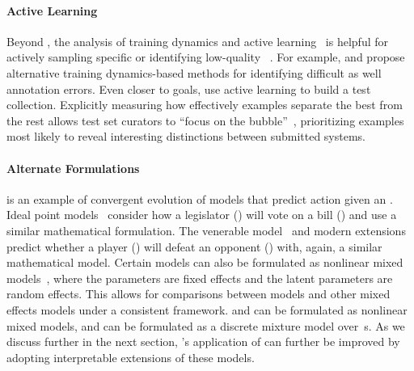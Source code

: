 \paragraph{\textbf{Active Learning}}
Beyond \irt{}, the analysis of training dynamics and active learning~\citep{settles-09} is helpful for actively sampling specific \itms{} or identifying low-quality \itms{}~\citep{brodley1999mislabel}.
For example, \citet{swayamdipta2020cartography} and \citet{pleiss2020aum} propose alternative training dynamics-based methods for identifying difficult \itms{} as well annotation errors.
Even closer to goals, \citet{rahman2020active} use active learning to build a test collection.
Explicitly measuring how effectively examples separate the best \subj{} from the rest allows test set curators to ``focus on the bubble''~\citep{Boyd-Graber-20}, prioritizing examples most likely to reveal interesting distinctions between submitted systems.

\paragraph{\textbf{Alternate Formulations}}
\irt{} is an example of convergent evolution of models that
predict \subj{} action given an \itm{}.
Ideal point models~\cite{poole2017voting} consider how a legislator (\subj{})
will vote on a bill (\itm{}) and use a similar mathematical formulation.
The venerable  model~\cite{glickman-99} and modern
extensions~\cite{herbrich-07} predict whether a player (\subj{}) will
defeat an opponent (\itm{}) with, again, a similar mathematical model.
Certain \irt{} models can also be formulated as nonlinear mixed
models~\cite{rijmen2003nonlinear}, where the \itm{} parameters are fixed effects
and the latent \subj{} parameters are random effects.
This allows for comparisons between \irt{} models and other mixed effects models
under a consistent framework.
        {\bf {}} and {\bf {}} can be formulated as nonlinear mixed models, and {\bf {}} can be formulated as a discrete mixture model over~\itm{}s.
As we discuss further in the next section, \name{}'s application of
\irt{} can further be improved by adopting interpretable extensions of
these models.



